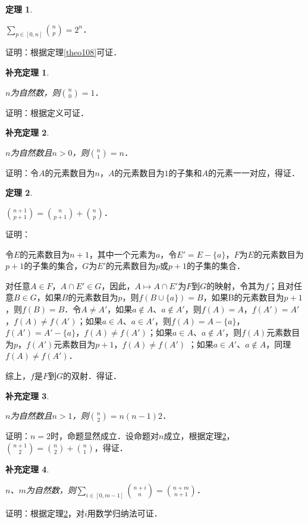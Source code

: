 \documentclass[12pt, a4paper, oneside]{book}
\newtheorem{theo}{定理}
\newtheorem{cor}{补充定理}
\begin{document}
			\begin{theo}\label{theo148}
				\hfill\par
				$\sum\limits_{p\in [0, n]}\binom{n}{p}=2^n$．
			\end{theo}
			证明：根据定理\ref{theo108}可证．
			
			\begin{cor}\label{cor324}
				\hfill\par
				$n$为自然数，则$\binom{n}{0}=1$．
			\end{cor}
			证明：根据定义可证．
			
			\begin{cor}\label{cor325}
				\hfill\par
				$n$为自然数且$n>0$，则$\binom{n}{1}=n$．
			\end{cor}
			证明：令$A$的元素数目为$n$，$A$的元素数目为$1$的子集和$A$的元素一一对应，得证．
			
			\begin{theo}\label{theo149}
				\hfill\par
				$\binom{n+1}{p+1}=\binom{n}{p+1}+\binom{n}{p}$．
			\end{theo}
			证明：
			\par
			令$E$的元素数目为$n+1$，其中一个元素为$a$，令$E'=E-\{a\}$，$F$为$E$的元素数目为$p+1$的子集的集合，$G$为$E'$的元素数目为$p$或$p+1$的子集的集合．
			\par
			对任意$A\in F$，$A\cap E'\in G$，因此，$A\mapsto A\cap E'$为$F$到$G$的映射，令其为$f$；且对任意$B\in G$，如果$B$的元素数目为$p$，则$f(B\cup\{a\})=B$，如果B的元素数目为$p+1$，则$f(B)=B$．令$A\neq A'$，如果$a\notin A$、$a\notin A'$，则$f(A)=A$，$f(A')=A'$，$f(A)\neq f(A')$；如果$a\in A$、$a\in A'$，则$f(A)=A-\{a\}$，$f(A')=A'-\{a\}$，$f(A)\neq f(A')$；如果$a\in A$、$a\notin A'$，则$f(A)$元素数目为$p$，$f(A')$元素数目为$p+1$，$f(A)\neq f(A')$ ；如果$a\in A'$、$a\notin A$，同理$f(A)\neq f(A')$．
			\par
			综上，$f$是$F$到$G$的双射．得证．
			
			\begin{cor}\label{cor326}
				\hfill\par
				$n$为自然数且$n>1$，则$\binom{n}{2}=n(n-1)2$．
			\end{cor}
			证明：$n=2$时，命题显然成立．设命题对$n$成立，根据定理\ref{theo149}，$\binom{n+1}{2}=\binom{n}{2}+\binom{n}{1}$，得证．
			
			\begin{cor}\label{cor327}
				\hfill\par
				$n$、$m$为自然数，则$\sum\limits_{i\in [0, m-1]}\binom{n+i}{n}=\binom{n+m}{n+1}$．
			\end{cor}
			证明：根据定理\ref{theo149}，对$i$用数学归纳法可证．
			
\end{document}
